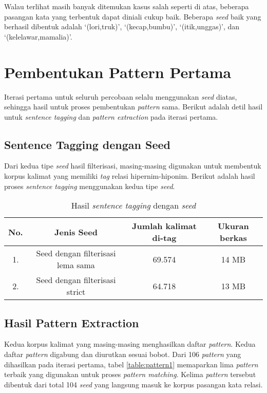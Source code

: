 Walau terlihat masih banyak ditemukan kasus salah seperti di atas, beberapa pasangan kata yang terbentuk dapat diniali cukup baik. Beberapa \textit{seed} baik yang berhasil dibentuk adalah `(lori,truk)', `(kecap,bumbu)', `(itik,unggas)', dan `(kelelawar,mamalia)'.

%
\section{Pembentukan Pattern Pertama}
Iterasi pertama untuk seluruh percobaan selalu menggunakan \textit{seed} diatas, sehingga hasil untuk proses pembentukan \textit{pattern} sama. Berikut adalah detil hasil untuk \textit{sentence tagging} dan \textit{pattern extraction} pada iterasi pertama.

\subsection{Sentence Tagging dengan Seed}
Dari kedua tipe \textit{seed} hasil filterisasi, masing-masing digunakan untuk membentuk korpus kalimat yang memiliki \textit{tag} relasi hipernim-hiponim. Berikut adalah hasil proses \textit{sentence tagging} menggunakan kedua tipe \textit{seed}.

\begin{table}
  \centering
  \caption{Hasil \textit{sentence tagging} dengan \textit{seed}}
  \label{table:sentencetagging1}
  \begin{tabular}{|c|c|c|c|}
    \hline
      No. & Jenis Seed                        & Jumlah kalimat di-tag & Ukuran berkas \\ \hline
      1.  & Seed dengan filterisasi lema sama & 69.574                & 14 MB         \\ \hline
      2.  & Seed dengan filterisasi strict    & 64.718                & 13 MB         \\ \hline
  \end{tabular}
\end{table}

\subsection{Hasil Pattern Extraction}
Kedua korpus kalimat yang masing-masing menghasilkan daftar \textit{pattern}. Kedua daftar \textit{pattern} digabung dan diurutkan sesuai bobot. Dari 106 \textit{pattern} yang dihasilkan pada iterasi pertama, tabel \ref{table:pattern1} memaparkan lima \textit{pattern} terbaik yang digunakan untuk proses \textit{pattern matching}. Kelima \textit{pattern} tersebut dibentuk dari total 104 \textit{seed} yang langsung masuk ke korpus pasangan kata relasi.


